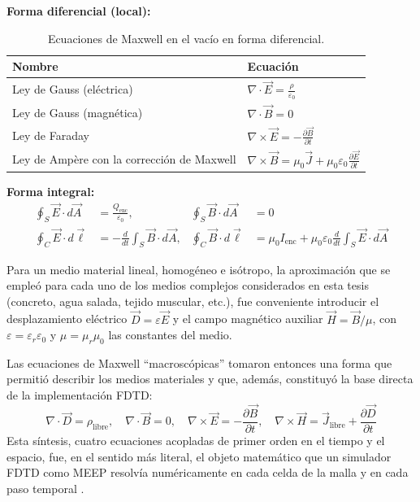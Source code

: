 \textbf{Forma diferencial (local):}
\begin{table}[htbp]
    \centering
    \renewcommand{\arraystretch}{1.5}
    \begin{tabular}{ll}
        \hline
        \textbf{Nombre} & \textbf{Ecuación} \\
        \hline
        Ley de Gauss (eléctrica) & $\nabla \cdot \vec{E} = \frac{\rho}{\varepsilon_0}$ \\
        Ley de Gauss (magnética) & $\nabla \cdot \vec{B} = 0$ \\
        Ley de Faraday & $\nabla \times \vec{E} = -\frac{\partial \vec{B}}{\partial t}$ \\
        Ley de Ampère con la corrección de Maxwell & $\nabla \times \vec{B} = \mu_0 \vec{J} + \mu_0 \varepsilon_0 \frac{\partial \vec{E}}{\partial t}$ \\
        \hline
    \end{tabular}
    \caption{Ecuaciones de Maxwell en el vacío en forma diferencial.}
    \label{tab:maxwell_diferencial}
\end{table}

\textbf{Forma integral:}
\begin{align}
    \oint_S \vec{E} \cdot d\vec{A} &= \frac{Q_{\text{enc}}}{\varepsilon_0}, & \oint_S \vec{B} \cdot d\vec{A} &= 0 \\
    \oint_C \vec{E} \cdot d\vec{\ell} &= -\frac{d}{dt} \int_S \vec{B} \cdot d\vec{A}, & \oint_C \vec{B} \cdot d\vec{\ell} &= \mu_0 I_{\text{enc}} + \mu_0 \varepsilon_0 \frac{d}{dt} \int_S \vec{E} \cdot d\vec{A}
\end{align}

Para un medio material lineal, homogéneo e isótropo, la aproximación que se empleó para cada uno de los medios complejos considerados en esta tesis (concreto, agua salada, tejido muscular, etc.), fue conveniente introducir el desplazamiento eléctrico $\vec{D} = \varepsilon \vec{E}$ y el campo magnético auxiliar $\vec{H} = \vec{B}/\mu$, con $\varepsilon = \varepsilon_r \varepsilon_0$ y $\mu = \mu_r \mu_0$ las constantes del medio. 

Las ecuaciones de Maxwell ``macroscópicas'' tomaron entonces una forma que permitió describir los medios materiales y que, además, constituyó la base directa de la implementación FDTD:
\begin{equation}
    \nabla \cdot \vec{D} = \rho_{\text{libre}}, \quad \nabla \cdot \vec{B} = 0, \quad \nabla \times \vec{E} = -\frac{\partial \vec{B}}{\partial t}, \quad \nabla \times \vec{H} = \vec{J}_{\text{libre}} + \frac{\partial \vec{D}}{\partial t}
\end{equation}
Esta síntesis, cuatro ecuaciones acopladas de primer orden en el tiempo y el espacio, fue, en el sentido más literal, el objeto matemático que un simulador FDTD como MEEP resolvía numéricamente en cada celda de la malla y en cada paso temporal \cite{Teixeira2023}.

